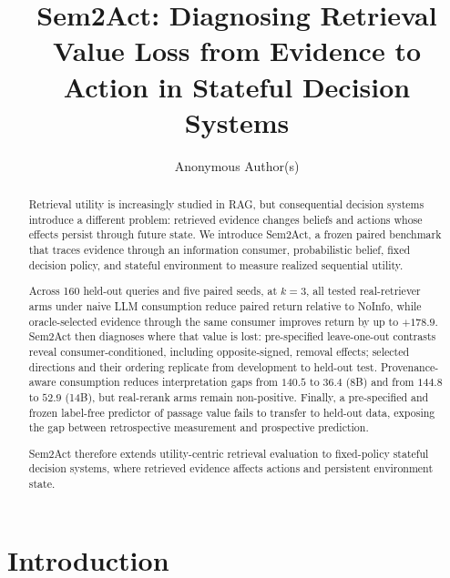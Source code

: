 \documentclass[a4paper,runningheads]{llncs}
\begin{document}
\title{Sem2Act: Diagnosing Retrieval Value Loss from Evidence to Action in Stateful Decision Systems}

\author{Anonymous Author(s)}

\maketitle

\begin{abstract}
Retrieval utility is increasingly studied in RAG, but consequential decision systems introduce a different problem: retrieved evidence changes beliefs and actions whose effects persist through future state. We introduce Sem2Act, a frozen paired benchmark that traces evidence through an information consumer, probabilistic belief, fixed decision policy, and stateful environment to measure realized sequential utility.

Across 160 held-out queries and five paired seeds, at $k=3$, all tested
real-retriever arms under naive LLM consumption reduce paired return
relative to NoInfo, while oracle-selected evidence through the same
consumer improves return by up to $+178.9$. Sem2Act then diagnoses where
that value is lost: pre-specified leave-one-out contrasts reveal
consumer-conditioned, including opposite-signed, removal effects; selected
directions and their ordering replicate from development to held-out test.
Provenance-aware consumption reduces interpretation gaps from $140.5$
to $36.4$ (8B) and from $144.8$ to $52.9$ (14B), but real-rerank arms
remain non-positive. Finally, a pre-specified and frozen
label-free predictor of passage value fails to transfer to held-out data,
exposing the gap between retrospective measurement and prospective
prediction.

Sem2Act therefore extends utility-centric retrieval evaluation to
fixed-policy stateful decision systems, where retrieved evidence affects
actions and persistent environment state.
\end{abstract}

\section{Introduction}
\label{sec:intro}
\end{document}
